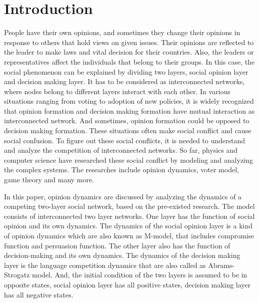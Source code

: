 \documentclass[english]{cccconf}
\begin{document}


\section{Introduction}
 People have their own opinions, and sometimes they change their opinions in response to others that hold views on given issues. Their opinions are reflected to the leader to make laws and vital decision for their countries. Also, the leaders or representatives affect the individuals that belong to their groups. In this case, the social phenomenon can be explained by dividing two layers, social opinion layer and decision making layer. It has to be considered as interconnected networks, where nodes belong to different layers interact with each other\cite{newman2010,boccaletti2014,domenico2013,tomasini2015,namkhanhvu2017}. In various situations ranging from voting to adoption of new policies, it is widely recognized that opinion formation and decision making formation have mutual interaction as interconnected network\cite{mikko2013, danziger2019}. And sometimes, opinion formation could be opposed to decision making formation. These situations often make social conflict and cause social confusion. To figure out these social conflicts, it is needed to understand and analyze the competition of interconnected networks. So far, physics and computer science have researched these social conflict by modeling and analyzing the complex systems\cite{huberman2004, zuev2012, laguna2004, masuda2015}. The researches include opinion dynamics, voter model, game theory and many more\cite{bianconi2018}. 
 
 In this paper, opinion dynamics are discussed by analyzing the dynamics of a competing two-layer social network, based on the pre-existed research\cite{alvarez2016, gomez2015, diep2017, rocca2014}. The model consists of interconnected two layer networks. One layer has the function of social opinion and its own dynamics. The dynamics of the social opinion layer is a kind of opinion dynamics which are also known as M-model\cite{rocca2014}, that includes compromise function and persuasion function. The other layer also has the function of decision-making and its own dynamics. The dynamics of the decision making layer is the language competition dynamics that are also called as Abrams-Strogatz model\cite{abrams2003, vazquez2010}. And, the initial condition of the two layers is assumed to be in opposite states, social opinion layer has all positive states, decision making layer has all negative states.
 
\end{document}
